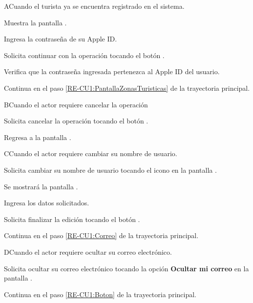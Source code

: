 	\begin{UCtrayectoriaA}{A}{Cuando el turista ya se encuentra registrado en el sistema.}
			
			\UCpaso Muestra la pantalla .
			
			\UCpaso [\UCactor] Ingresa la contraseña de su Apple ID.
			
			\UCpaso [\UCactor] Solicita continuar con la operación tocando el botón . 
			
			\UCpaso Verifica que la contraseña ingresada pertenezca al Apple ID del usuario. 
			
			\UCpaso Continua en el paso \ref{RE-CU1:PantallaZonasTuristicas} de la trayectoria principal.
			
	\end{UCtrayectoriaA}
		
	\begin{UCtrayectoriaA}{B}{Cuando el actor requiere cancelar la operación}
		
		\UCpaso [\UCactor] Solicita cancelar la operación tocando el botón .
		
		\UCpaso Regresa a la pantalla .
		
	\end{UCtrayectoriaA}
	
	\begin{UCtrayectoriaA}{C}{Cuando el actor requiere cambiar su nombre de usuario.}
		
		\UCpaso [\UCactor] Solicita cambiar su nombre de usuario tocando el icono \IUCambiarNombre{} en la pantalla .
		
		\UCpaso Se mostrará la pantalla .
		
		\UCpaso [\UCactor] Ingresa los datos solicitados.
		
		\UCpaso [\UCactor] Solicita finalizar la edición tocando el botón .
		
		\UCpaso Continua en el paso \ref{RE-CU1:Correo} de la trayectoria principal.
		
	\end{UCtrayectoriaA}

	\begin{UCtrayectoriaA}{D}{Cuando el actor requiere ocultar su correo electrónico.}
		
		\UCpaso [\UCactor] Solicita ocultar su correo electrónico tocando la opción \textbf{Ocultar mi correo} en la pantalla .
		
		\UCpaso Continua en el paso \ref{RE-CU1:Boton} de la trayectoria principal.
		
	\end{UCtrayectoriaA}

